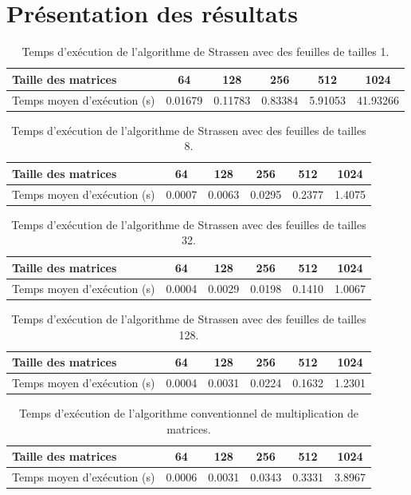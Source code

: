 \documentclass[a4paper, 12pt]{article} %
\begin{document}
\section{Présentation des résultats}
\begin{table}[H]
\caption{Temps d'exécution de l'algorithme de Strassen avec des feuilles de tailles 1.}
\centering
    \begin{tabular}{| l | c | c | c | c | c |}
    \hline
    Taille des matrices & 64 & 128 & 256 & 512 & 1024 \\
    \hline  
    Temps moyen d'exécution (s) & 0.01679 & 0.11783 & 0.83384 & 5.91053 & 41.93266 \\
    \hline  
    \end{tabular}
\end{table}
\begin{table}[H]
    \caption{Temps d'exécution de l'algorithme de Strassen avec des feuilles de tailles 8.}
    \centering
    \begin{tabular}{| l | c | c | c | c | c |}
    \hline    
    Taille des matrices & 64 & 128 & 256 & 512 & 1024 \\
    \hline  
    Temps moyen d'exécution (s) & 0.0007 & 0.0063 & 0.0295 & 0.2377 & 1.4075 \\
    \hline  
    \end{tabular}
\end{table}
\begin{table}[H]
    \caption{Temps d'exécution de l'algorithme de Strassen avec des feuilles de tailles 32.}
    \centering
    \begin{tabular}{| l | c | c | c | c | c |}
    \hline
    Taille des matrices & 64 & 128 & 256 & 512 & 1024 \\
    \hline  
    Temps moyen d'exécution (s) & 0.0004 & 0.0029 & 0.0198 & 0.1410 & 1.0067 \\
    \hline      
    \end{tabular}
\end{table}
\begin{table}[H]
    \caption{Temps d'exécution de l'algorithme de Strassen avec des feuilles de tailles 128.}
    \centering
    \begin{tabular}{| l | c | c | c | c | c |}
    \hline
    Taille des matrices & 64 & 128 & 256 & 512 & 1024 \\
    \hline  
    Temps moyen d'exécution (s) & 0.0004 & 0.0031 & 0.0224 & 0.1632 & 1.2301 \\
    \hline  
    \end{tabular}
\end{table}
\begin{table}[H]
    \caption{Temps d'exécution de l'algorithme conventionnel de multiplication de matrices.}
    \centering
    \begin{tabular}{| l | c | c | c | c | c |}
    \hline
    Taille des matrices & 64 & 128 & 256 & 512 & 1024 \\
    \hline  
    Temps moyen d'exécution (s) & 0.0006 & 0.0031 & 0.0343 & 0.3331 & 3.8967 \\
    \hline  
    \end{tabular}
\end{table}
\end{document}
